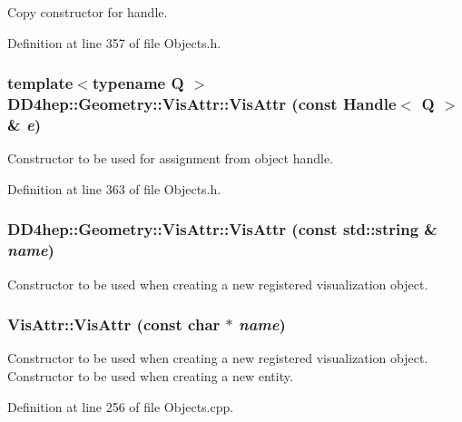 Copy constructor for handle. 

Definition at line 357 of file Objects.h.\hypertarget{class_d_d4hep_1_1_geometry_1_1_vis_attr_a5d9efb08d4afcfc0bab1392ba1135136}{
\subsubsection[{VisAttr}]{\setlength{\rightskip}{0pt plus 5cm}template$<$typename Q $>$ DD4hep::Geometry::VisAttr::VisAttr (const {\bf Handle}$<$ Q $>$ \& {\em e})}}
\label{class_d_d4hep_1_1_geometry_1_1_vis_attr_a5d9efb08d4afcfc0bab1392ba1135136}


Constructor to be used for assignment from object handle. 

Definition at line 363 of file Objects.h.\hypertarget{class_d_d4hep_1_1_geometry_1_1_vis_attr_af26cd4dd56c035b1a956fc6da8ca9b04}{
\subsubsection[{VisAttr}]{\setlength{\rightskip}{0pt plus 5cm}DD4hep::Geometry::VisAttr::VisAttr (const std::string \& {\em name})}}
\label{class_d_d4hep_1_1_geometry_1_1_vis_attr_af26cd4dd56c035b1a956fc6da8ca9b04}


Constructor to be used when creating a new registered visualization object. \hypertarget{class_d_d4hep_1_1_geometry_1_1_vis_attr_aba0f08cd43ea7d03cf730c5549356fa6}{
\subsubsection[{VisAttr}]{\setlength{\rightskip}{0pt plus 5cm}VisAttr::VisAttr (const char $\ast$ {\em name})}}
\label{class_d_d4hep_1_1_geometry_1_1_vis_attr_aba0f08cd43ea7d03cf730c5549356fa6}


Constructor to be used when creating a new registered visualization object. Constructor to be used when creating a new entity. 

Definition at line 256 of file Objects.cpp.

